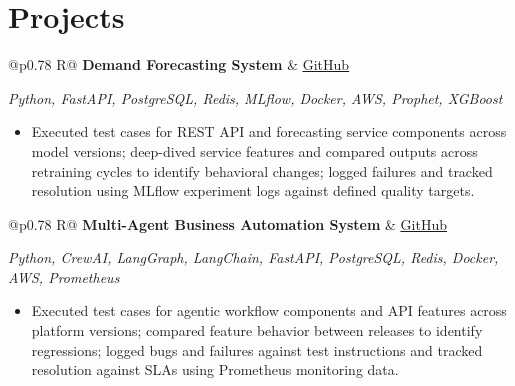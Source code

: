 \documentclass[a4paper,10pt]{article}
\newcommand{\ulink}[2]{\href{#1}{\uline{#2}}}
\newcommand{\subheading}[1]{{\color[HTML]{0A0A0A}\fontsize{12}{14}\selectfont\bfseries #1}}
\newcommand{\techstack}[1]{{\color[HTML]{5C5C5C}\fontsize{10.5}{12.5}\selectfont\itshape #1}}
\newcommand{\meta}[1]{{\color[HTML]{5C5C5C}\fontsize{10.5}{12.5}\selectfont #1}}
\begin{document}
\vspace{2pt}

\section{Projects}
\vspace{2pt}

\begin{tabularx}{\linewidth}{@{}p{0.78\linewidth} R@{}}
\subheading{Demand Forecasting System} & \meta{\ulink{https://github.com/su-jin1425/Demand-Forecasting-System}{GitHub}}
\end{tabularx}
\vspace{1pt}
\techstack{Python, FastAPI, PostgreSQL, Redis, MLflow, Docker, AWS, Prophet, XGBoost}
\begin{itemize}[nosep, leftmargin=1.5em, itemsep=1pt, topsep=2pt]
\item {\color[HTML]{0A0A0A}\fontsize{11}{14}\selectfont
Executed test cases for REST API and forecasting service components across model versions; deep-dived service features and compared outputs across retraining cycles to identify behavioral changes; logged failures and tracked resolution using MLflow experiment logs against defined quality targets.}
\end{itemize}

\vspace{2pt}

\begin{tabularx}{\linewidth}{@{}p{0.78\linewidth} R@{}}
\subheading{Multi-Agent Business Automation System} & \meta{\ulink{https://github.com/su-jin1425/Multi-Agent-Business-Automation}{GitHub}}
\end{tabularx}
\vspace{1pt}
\techstack{Python, CrewAI, LangGraph, LangChain, FastAPI, PostgreSQL, Redis, Docker, AWS, Prometheus}
\begin{itemize}[nosep, leftmargin=1.5em, itemsep=1pt, topsep=2pt]
\item {\color[HTML]{0A0A0A}\fontsize{11}{14}\selectfont
Executed test cases for agentic workflow components and API features across platform versions; compared feature behavior between releases to identify regressions; logged bugs and failures against test instructions and tracked resolution against SLAs using Prometheus monitoring data.}
\end{itemize}

\vspace{2pt}
\end{document}
